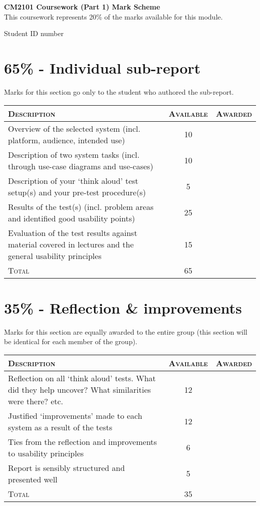 \documentclass[11pt,a4paper]{report}
\begin{document}
\textbf{CM2101 Coursework (Part 1) Mark Scheme}\\
\vskip5pt
This coursework represents 20\% of the marks available for this module.

\vskip30pt


\begin{description}
    \item[Student ID number]
\end{description}

\section*{65\% - Individual sub-report}
Marks for this section go only to the student who authored the sub-report.\\

\begin{tabular}{p{11cm}|c|c}
    \textsc{Description} & \textsc{Available} & \textsc{Awarded} \\
    \hline
    \hline
    Overview of the selected system (incl. platform, audience, intended use) & 10 &  \\
    \hline
    Description of two system tasks (incl. through use-case diagrams and use-cases) & 10 & \\
    \hline 
    Description of your `think aloud' test setup(s) and your pre-test procedure(s) & 5 & \\
    \hline
    Results of the test(s) (incl. problem areas and identified good usability points) & 25 & \\
    \hline  
    Evaluation of the test results against material covered in lectures and the general usability principles & 15 & \\ 
    \hline
    \hline
    \textsc{Total} & 65 &
\end{tabular}

\section*{35\% - Reflection \& improvements}
Marks for this section are equally awarded to the entire group (this section will be identical for each member of the group).\\

\begin{tabular}{p{11cm}|c|c}
    \textsc{Description} & \textsc{Available} & \textsc{Awarded} \\
    \hline
    \hline
    Reflection on all `think aloud' tests. What did they help uncover? What similarities were there? etc. & 12 &  \\
    \hline
    Justified `improvements' made to each system as a result of the tests & 12 & \\
    \hline
    Ties from the reflection and improvements to usability principles & 6 & \\
    \hline
    Report is sensibly structured and presented well & 5 & \\ 
    \hline
    \hline
    \textsc{Total} & 35 &
\end{tabular}
\end{document}
